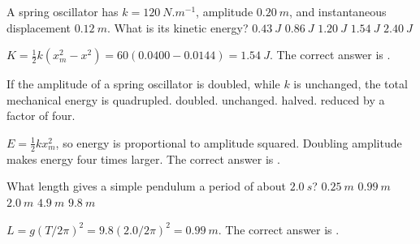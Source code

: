 \documentclass[full,print,11pt,a4paper]{physicsquiz}
\begin{document}
\begin{quizbank}
  \begin{quizquestion}[
    id=ow-energy-007,
    topic=energy-in-shm,
    difficulty=applied,
    marks=1,
    correct=D,
    tags={energy,kinetic-energy},
    outcome={Find kinetic energy from amplitude and displacement}
  ]
    A spring oscillator has \(k=\SI{120}{N.m^{-1}}\), amplitude
    \(\SI{0.20}{m}\), and instantaneous displacement \(\SI{0.12}{m}\). What is
    its kinetic energy?
    \choices
      {\(\SI{0.43}{J}\)}
      {\(\SI{0.86}{J}\)}
      {\(\SI{1.20}{J}\)}
      {\(\SI{1.54}{J}\)}
      {\(\SI{2.40}{J}\)}
  \end{quizquestion}
  \begin{quizsolution}
    \(K=\frac{1}{2}k(x_m^2-x^2)=60(0.0400-0.0144)=\SI{1.54}{J}\). The correct
    answer is \quizcorrectletter.
  \end{quizsolution}

  \begin{quizquestion}[
    id=ow-energy-008,
    topic=energy-in-shm,
    difficulty=foundation,
    marks=1,
    correct=A,
    tags={energy,amplitude},
    outcome={Relate SHM energy to amplitude}
  ]
    If the amplitude of a spring oscillator is doubled, while \(k\) is unchanged,
    the total mechanical energy is
    \choices
      {quadrupled.}
      {doubled.}
      {unchanged.}
      {halved.}
      {reduced by a factor of four.}
  \end{quizquestion}
  \begin{quizsolution}
    \(E=\frac{1}{2}kx_m^2\), so energy is proportional to amplitude squared.
    Doubling amplitude makes energy four times larger. The correct answer is
    \quizcorrectletter.
  \end{quizsolution}

  \begin{quizquestion}[
    id=ow-pendulum-009,
    topic=pendulums,
    difficulty=applied,
    marks=1,
    correct=B,
    tags={simple-pendulum},
    outcome={Compute simple pendulum length from period}
  ]
    What length gives a simple pendulum a period of about \(\SI{2.0}{s}\)?
    \choices
      {\(\SI{0.25}{m}\)}
      {\(\SI{0.99}{m}\)}
      {\(\SI{2.0}{m}\)}
      {\(\SI{4.9}{m}\)}
      {\(\SI{9.8}{m}\)}
  \end{quizquestion}
  \begin{quizsolution}
    \(L=g(T/2\pi)^2=9.8(2.0/2\pi)^2=\SI{0.99}{m}\). The correct answer is
    \quizcorrectletter.
  \end{quizsolution}


\end{quizbank}
\end{document}
